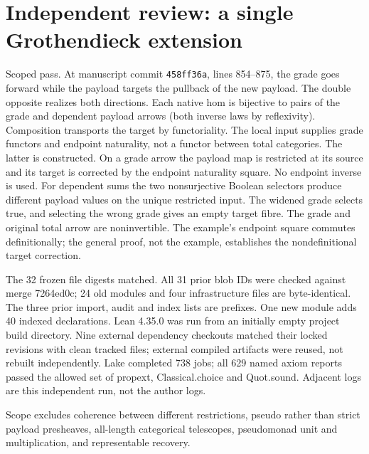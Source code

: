 \documentclass{article}
\begin{document}
\section*{Independent review: a single Grothendieck extension}
Scoped pass. At manuscript commit \texttt{458ff36a}, lines 854--875,
the grade goes forward while the payload targets the pullback of the new
payload. The double opposite realizes both directions. Each native hom
is bijective to pairs of the grade and dependent payload arrows (both inverse
laws by reflexivity). Composition transports the target by functoriality.
The local input supplies grade functors and endpoint naturality, not a
functor between total categories. The latter is constructed. On a grade
arrow the payload map is restricted at its source and its target is
corrected by the endpoint naturality square. No endpoint inverse is used.
For dependent sums the two nonsurjective Boolean selectors produce different
payload values on the unique restricted input. The widened grade selects
true, and selecting the wrong grade gives an empty target fibre. The grade
and original total arrow are noninvertible. The example's endpoint square
commutes definitionally; the general proof, not the example, establishes
the nondefinitional target correction.
\par The 32 frozen file digests matched. All 31 prior blob IDs were checked
against merge 7264ed0c; 24 old modules and four infrastructure files are
byte-identical. The three prior import, audit and index lists are prefixes.
One new module adds 40 indexed declarations. Lean 4.35.0 was run from
an initially empty project build directory. Nine external dependency
checkouts matched their locked revisions with clean tracked files; external
compiled artifacts were reused, not rebuilt independently. Lake completed
738 jobs; all 629 named axiom reports passed the allowed set of
propext, Classical.choice and Quot.sound. Adjacent logs are this independent
run, not the author logs.
\par Scope excludes coherence between different restrictions, pseudo rather
than strict payload presheaves, all-length categorical telescopes,
pseudomonad unit and multiplication, and representable recovery.
\end{document}

